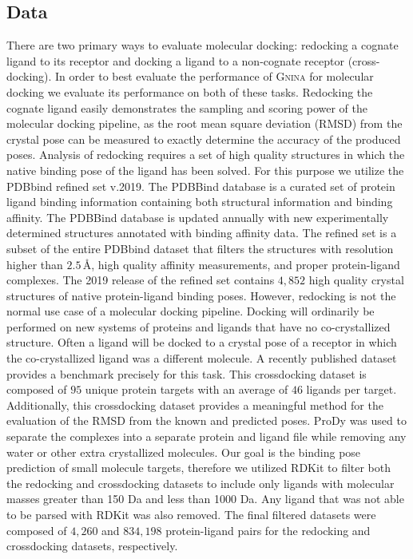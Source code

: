 \documentclass[journal=jcisd8,manuscript=article]{achemso}
\begin{document}
\subsection{Data}
There are two primary ways to evaluate molecular docking: redocking a cognate ligand to its receptor and docking a ligand to a non-cognate receptor (cross-docking). In order to best evaluate the performance of \textsc{Gnina} for molecular docking we evaluate its performance on both of these tasks. Redocking the cognate ligand easily demonstrates the sampling and scoring power of the molecular docking pipeline, as the root mean square deviation (RMSD) from the crystal pose can be measured to exactly determine the accuracy of the produced poses. Analysis of redocking requires a set of high quality structures in which the native binding pose of the ligand has been solved. For this purpose we utilize the PDBbind refined set v.2019. The PDBBind database is a curated set of protein ligand binding information containing both structural information and binding affinity. The PDBBind database is updated annually with new experimentally determined structures annotated with binding affinity data. The refined set is a subset of the entire PDBbind dataset that filters the structures with resolution higher than $2.5\,$\AA, high quality affinity measurements, and proper protein-ligand complexes. The 2019 release of the refined set contains $4,852$ high quality crystal structures of native protein-ligand binding poses. However, redocking is not the normal use case of a molecular docking pipeline. Docking will ordinarily be performed on new systems of proteins and ligands that have no co-crystallized structure. Often a ligand will be docked to a crystal pose of a receptor in which the co-crystallized ligand was a different molecule. A recently published dataset provides a benchmark precisely for this task\cite{wierbowski2020cross}. This crossdocking dataset is composed of $95$ unique protein targets with an average of $46$ ligands per target. Additionally, this crossdocking dataset provides a meaningful method for the evaluation of the RMSD from the known and predicted poses. ProDy\cite{bakan2011prody} was used to separate the complexes into a separate protein and ligand file while removing any water or other extra crystallized molecules. Our goal is the binding pose prediction of small molecule targets, therefore we utilized RDKit\cite{rdkit} to filter both the redocking and crossdocking datasets to include only ligands with molecular masses greater than 150 Da and less than 1000 Da. Any ligand that was not able to be parsed with RDKit was also removed. The final filtered datasets were composed of $4,260$ and $834,198$ protein-ligand pairs for the redocking and crossdocking datasets, respectively.
\end{document}
